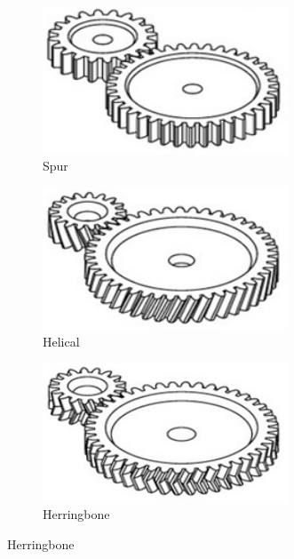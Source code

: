 \documentclass[10pt,letterpaper]{book}
\begin{document}
\begin{figure}[H]
	\begin{subfigure}[b]{.32\linewidth}
		\includegraphics[width=0.8\textwidth]{imgs/gear_spur.png}
		\caption{Spur}
	\end{subfigure}\begin{subfigure}[b]{.32\linewidth}
		\includegraphics[width=0.8\textwidth]{imgs/gear_helical.png}
		\caption{Helical}
	\end{subfigure}\begin{subfigure}[b]{.32\linewidth}
		\includegraphics[width=0.8\textwidth]{imgs/gear_herringbore.png}
		\caption{Herringbone}
	\end{subfigure}
	

\end{figure}
\end{document}
